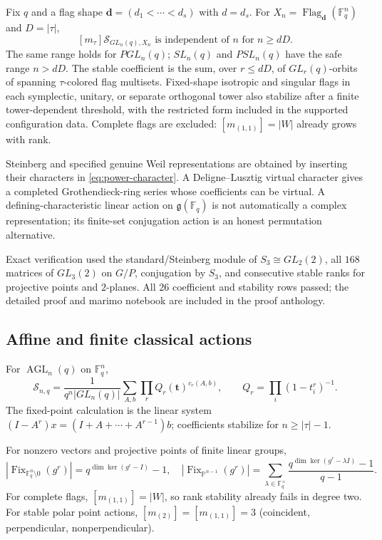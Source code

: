 \documentclass[10pt]{article}
\newcommand{\Fix}{\operatorname{Fix}}
\newcommand{\MGF}{\mathcal S}
\newcommand{\F}{\mathbb F}
\begin{document}
Fix $q$ and a flag shape $\mathbf d=(d_1<\cdots<d_s)$ with $d=d_s$.
For $X_n=\operatorname{Flag}_{\mathbf d}(\F_q^n)$ and $D=|\tau|$,
\begin{equation}\label{eq:bounded-flag-stability}
\boxed{[m_\tau]\MGF_{GL_n(q),X_n}\text{ is independent of $n$ for }n\ge dD.}
\end{equation}
The same range holds for $PGL_n(q)$; $SL_n(q)$ and $PSL_n(q)$ have the safe
range $n>dD$.  The stable coefficient is the sum, over $r\le dD$, of
$GL_r(q)$-orbits of spanning $\tau$-colored flag multisets.  Fixed-shape
isotropic and singular flags in each symplectic, unitary, or separate
orthogonal tower also stabilize after a finite tower-dependent threshold,
with the restricted form included in the supported configuration data.
Complete flags are excluded: $[m_{(1,1)}]=|W|$ already grows with rank.

Steinberg and specified genuine Weil representations are obtained by inserting
their characters in \eqref{eq:power-character}.  A Deligne--Lusztig virtual
character gives a completed Grothendieck-ring series whose coefficients can be
virtual.  A defining-characteristic linear action on $\mathfrak g(\F_q)$ is
not automatically a complex representation; its finite-set conjugation action
is an honest permutation alternative.

Exact verification used the standard/Steinberg module of
$S_3\cong GL_2(2)$, all $168$ matrices of $GL_3(2)$ on $G/P$, conjugation by
$S_3$, and consecutive stable ranks for projective points and $2$-planes.  All
26 coefficient and stability rows passed; the detailed proof and marimo
notebook are included in the proof anthology.

\subsection{Affine and finite classical actions}
For $\operatorname{AGL}_n(q)$ on $\F_q^n$,
\begin{equation}\label{eq:agl}
\boxed{\MGF_{n,q}=\frac1{q^n|GL_n(q)|}\sum_{A,b}
 \prod_r Q_r(\mathbf t)^{c_r(A,b)},\qquad
Q_r=\prod_i(1-t_i^r)^{-1}.}
\end{equation}
The fixed-point calculation is the linear system
$(I-A^r)x=(I+A+\cdots+A^{r-1})b$; coefficients stabilize for
$n\ge|\tau|-1$.

For nonzero vectors and projective points of finite linear groups,
\[
|\Fix_{\F_q^n\setminus0}(g^r)|=q^{\dim\ker(g^r-I)}-1,
\quad
|\Fix_{\mathbb P^{n-1}}(g^r)|=
\sum_{\lambda\in\F_q^\times}\frac{q^{\dim\ker(g^r-\lambda I)}-1}{q-1}.
\]
For complete flags, $[m_{(1,1)}]=|W|$, so rank stability already fails in
degree two. For stable polar point actions,
$[m_{(2)}]=[m_{(1,1)}]=3$ (coincident, perpendicular, nonperpendicular).
\end{document}
